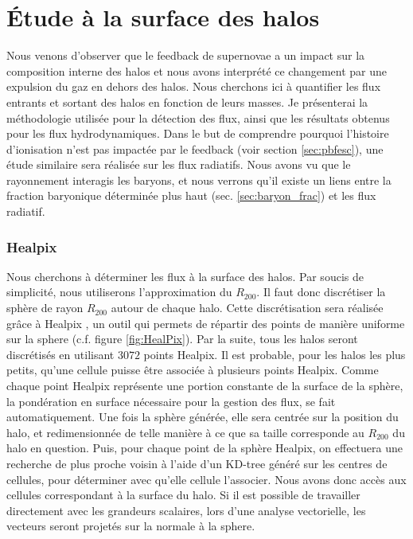 \clearpage
\section{Étude à la surface des halos}

Nous venons d'observer que le feedback de supernovae a un impact sur la composition interne des halos et nous avons interprété ce changement par une expulsion du gaz en dehors des halos.
Nous cherchons ici à quantifier les flux entrants et sortant des halos en fonction de leurs masses.
Je présenterai la méthodologie utilisée pour la détection des flux, ainsi que les résultats obtenus pour les flux hydrodynamiques.
Dans le but de comprendre pourquoi l'histoire d'ionisation n'est pas impactée par le feedback (voir section \ref{sec:pbfesc}), une étude similaire sera réalisée sur les flux radiatifs.
Nous avons vu que le rayonnement interagis les baryons, et nous verrons qu'il existe un liens entre la fraction baryonique déterminée plus haut (sec. \ref{sec:baryon_frac}) et les flux radiatif.

\subsubsection{Healpix}
\label{sec:healpix}

Nous cherchons à déterminer les flux à la surface des halos.
Par soucis de simplicité, nous utiliserons l'approximation du $R_{200}$.
Il faut donc discrétiser la sphère de rayon $R_{200}$ autour de chaque halo.
Cette discrétisation sera réalisée grâce à Healpix \citep{gorski_healpix:_2005}, un outil qui permets de répartir des points de manière uniforme sur la sphere (c.f. figure \ref{fig:HealPix}).
Par la suite, tous les halos seront discrétisés en utilisant $3072$ points Healpix.
Il est probable, pour les halos les plus petits, qu'une cellule puisse être associée à plusieurs points Healpix.
Comme chaque point Healpix représente une portion constante de la surface de la sphère, la pondération en surface nécessaire pour la gestion des flux, se fait automatiquement.
Une fois la sphère générée, elle sera centrée sur la position du halo, et redimensionnée de telle manière à ce que sa taille corresponde au $R_{200}$ du halo en question.
Puis, pour chaque point de la sphère Healpix, on effectuera une recherche de plus proche voisin à l'aide d'un KD-tree généré sur les centres de cellules, pour déterminer avec qu'elle cellule l'associer.
Nous avons donc accès aux cellules correspondant à la surface du halo.
Si il est possible de travailler directement avec les grandeurs scalaires, lors d'une analyse vectorielle, les vecteurs seront projetés sur la normale à la sphere.

